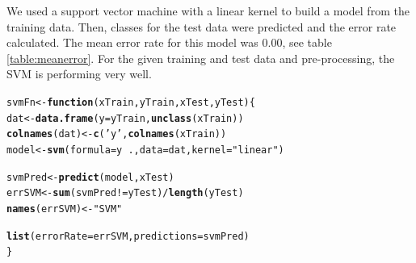 \documentclass[a4paper,draft=false]{scrreprt}\usepackage[]{graphicx}\usepackage[]{color}
\makeatletter
\newcommand{\hlstr}[1]{\textcolor[rgb]{0.192,0.494,0.8}{#1}}%
\newcommand{\hlopt}[1]{\textcolor[rgb]{0,0,0}{#1}}%
\newcommand{\hlstd}[1]{\textcolor[rgb]{0.345,0.345,0.345}{#1}}%
\newcommand{\hlkwa}[1]{\textcolor[rgb]{0.161,0.373,0.58}{\textbf{#1}}}%
\newcommand{\hlkwb}[1]{\textcolor[rgb]{0.69,0.353,0.396}{#1}}%
\newcommand{\hlkwc}[1]{\textcolor[rgb]{0.333,0.667,0.333}{#1}}%
\newcommand{\hlkwd}[1]{\textcolor[rgb]{0.737,0.353,0.396}{\textbf{#1}}}%
\newenvironment{kframe}{%
 \def\at@end@of@kframe{}%
 \ifinner\ifhmode%
  \def\at@end@of@kframe{\end{minipage}}%
  \begin{minipage}{\columnwidth}%
 \fi\fi%
 \def\FrameCommand##1{\hskip\@totalleftmargin \hskip-\fboxsep
 \colorbox{shadecolor}{##1}\hskip-\fboxsep
     \hskip-\linewidth \hskip-\@totalleftmargin \hskip\columnwidth}%
 \MakeFramed {\advance\hsize-\width
   \@totalleftmargin\z@ \linewidth\hsize
   \@setminipage}}%
 {\par\unskip\endMakeFramed%
 \at@end@of@kframe}
\newenvironment{knitrout}{}{} %
\makeatother
\begin{document}
We used a support vector machine with a linear kernel to build a model from the training data. Then, classes for the test data were predicted and the error rate calculated. The mean error rate for this model was $0.00$, see table \ref{table:meanerror}. For the given training and test data and pre-processing, the SVM is performing very well.
\begin{knitrout}
\color{fgcolor}\begin{kframe}
\begin{alltt}
\hlstd{svmFn} \hlkwb{<-} \hlkwa{function}\hlstd{(}\hlkwc{xTrain}\hlstd{,} \hlkwc{yTrain}\hlstd{,} \hlkwc{xTest}\hlstd{,} \hlkwc{yTest}\hlstd{)\{}
    \hlstd{dat} \hlkwb{<-} \hlkwd{data.frame}\hlstd{(}\hlkwc{y} \hlstd{= yTrain,} \hlkwd{unclass}\hlstd{(xTrain))}
    \hlkwd{colnames}\hlstd{(dat)} \hlkwb{<-} \hlkwd{c}\hlstd{(}\hlstr{'y'}\hlstd{,} \hlkwd{colnames}\hlstd{(xTrain))}
    \hlstd{model} \hlkwb{<-} \hlkwd{svm}\hlstd{(}\hlkwc{formula} \hlstd{= y} \hlopt{~} \hlstd{.,} \hlkwc{data} \hlstd{= dat,} \hlkwc{kernel} \hlstd{=} \hlstr{"linear"}\hlstd{)}

    \hlstd{svmPred} \hlkwb{<-} \hlkwd{predict}\hlstd{(model, xTest)}
    \hlstd{errSVM} \hlkwb{<-} \hlkwd{sum}\hlstd{(svmPred} \hlopt{!=} \hlstd{yTest)} \hlopt{/} \hlkwd{length}\hlstd{(yTest)}
    \hlkwd{names}\hlstd{(errSVM)} \hlkwb{<-} \hlstr{"SVM"}

    \hlkwd{list}\hlstd{(}\hlkwc{errorRate} \hlstd{= errSVM,} \hlkwc{predictions} \hlstd{= svmPred)}
\hlstd{\}}
\end{alltt}
\end{kframe}
\end{knitrout}
\end{document}
